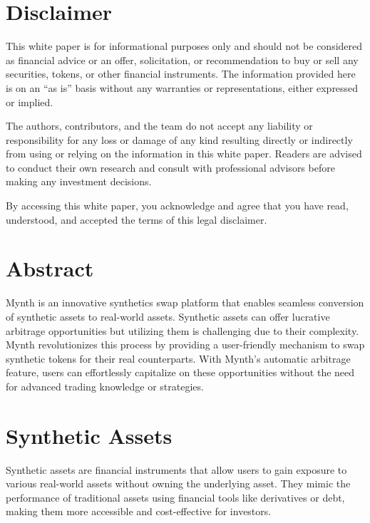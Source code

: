 \hypertarget{disclaimer}{%
\section{Disclaimer}\label{disclaimer}}

This white paper is for informational purposes only and should not be
considered as financial advice or an offer, solicitation, or
recommendation to buy or sell any securities, tokens, or other financial
instruments. The information provided here is on an ``as is'' basis
without any warranties or representations, either expressed or implied.

The authors, contributors, and the team do not accept any liability or
responsibility for any loss or damage of any kind resulting directly or
indirectly from using or relying on the information in this white paper.
Readers are advised to conduct their own research and consult with
professional advisors before making any investment decisions.

By accessing this white paper, you acknowledge and agree that you have
read, understood, and accepted the terms of this legal disclaimer.

\hypertarget{abstract}{%
\section{Abstract}\label{abstract}}

Mynth is an innovative synthetics swap platform that enables seamless
conversion of synthetic assets to real-world assets. Synthetic assets
can offer lucrative arbitrage opportunities but utilizing them is
challenging due to their complexity. Mynth revolutionizes this process
by providing a user-friendly mechanism to swap synthetic tokens for
their real counterparts. With Mynth's automatic arbitrage feature, users
can effortlessly capitalize on these opportunities without the need for
advanced trading knowledge or strategies.

\hypertarget{synthetic-assets}{%
\section{Synthetic Assets}\label{synthetic-assets}}

Synthetic assets are financial instruments that allow users to gain
exposure to various real-world assets without owning the underlying
asset. They mimic the performance of traditional assets using financial
tools like derivatives or debt, making them more accessible and
cost-effective for investors.

